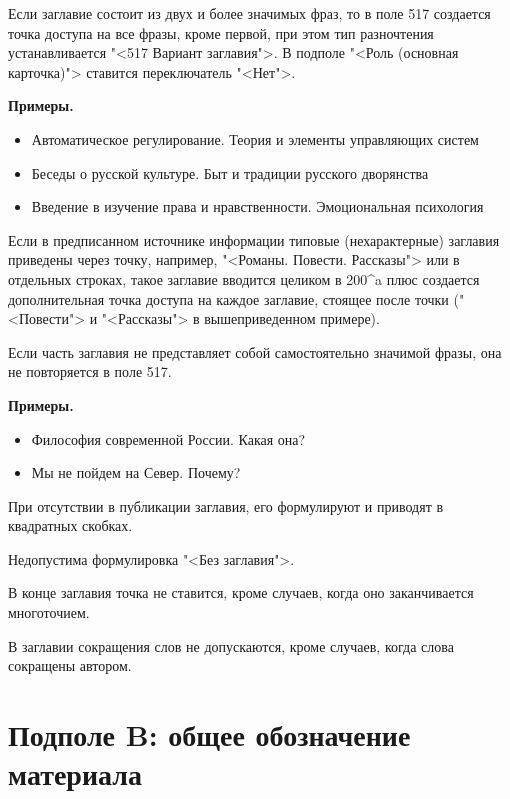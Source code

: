 Если заглавие состоит из двух и более значимых фраз, то в поле 517 создается точка доступа на все фразы, кроме первой, при этом тип разночтения устанавливается "<517 Вариант заглавия">. В подполе "<Роль (основная карточка)"> ставится переключатель "<Нет">.

\textbf{Примеры.}

\vspace{-3mm}
\begin{itemize}
    \setlength\itemsep{-2mm}
	\item Автоматическое регулирование. Теория и элементы управляющих систем
	\item Беседы о русской культуре. Быт и традиции русского дворянства
	\item Введение в изучение права и нравственности. Эмоциональная психология 
\end{itemize}

Если в предписанном источнике информации типовые (нехарактерные) заглавия приведены через точку, например, "<Романы. Повести. Рассказы"> или в отдельных строках, такое заглавие вводится целиком в 200\^{}a плюс создается дополнительная точка доступа на каждое заглавие, стоящее после точки ("<Повести"> и "<Рассказы"> в вышеприведенном примере).

Если часть заглавия не представляет собой самостоятельно значимой фразы, она не повторяется в поле 517.

\textbf{Примеры.}

\vspace{-3mm}
\begin{itemize}
    \setlength\itemsep{-2mm}
	\item Философия современной России. Какая она?
	\item Мы не пойдем на Север. Почему?
\end{itemize}

При отсутствии в публикации заглавия, его формулируют и приводят в квадратных скобках.

Недопустима формулировка "<Без заглавия">.

В конце заглавия точка не ставится, кроме случаев, когда оно заканчивается многоточием.

В заглавии сокращения слов не допускаются, кроме случаев, когда слова сокращены автором.


\section{Подполе B: общее обозначение материала}


